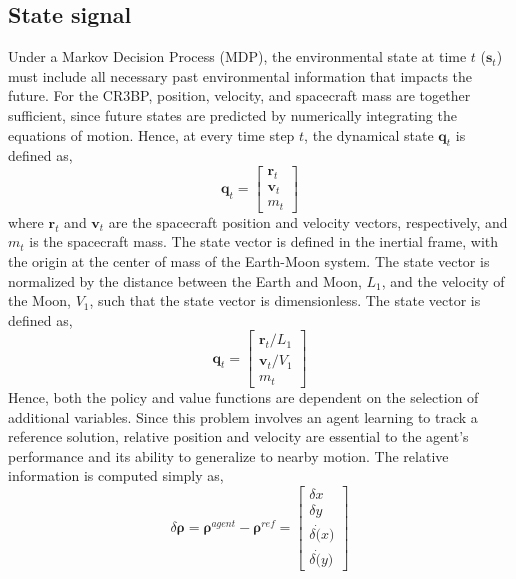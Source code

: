 \documentclass[conference]{IEEEtran}
\begin{document}
\subsection{State signal}
Under a Markov Decision Process (MDP), the environmental state at time \(t\) (\(\boldsymbol{s}_t\)) must include all necessary past environmental information that impacts the future. For the CR3BP, position, velocity, and spacecraft mass are together sufficient, since future states are predicted by numerically integrating the equations of motion. Hence, at every time step \(t\), the dynamical state \(\boldsymbol{q}_t\)
 is defined as,
\begin{equation}
    \boldsymbol{q}_t = \begin{bmatrix}
        \boldsymbol{r}_t \\
        \boldsymbol{v}_t \\
        m_t
    \end{bmatrix}
\end{equation}
where \(\boldsymbol{r}_t\) and \(\boldsymbol{v}_t\) are the spacecraft position and velocity vectors, respectively, and \(m_t\) is the spacecraft mass. The state vector is defined in the inertial frame, with the origin at the center of mass of the Earth-Moon system. The state vector is normalized by the distance between the Earth and Moon, \(L_1\), and the velocity of the Moon, \(V_1\), such that the state vector is dimensionless. The state vector is defined as,
\begin{equation}
    \boldsymbol{q}_t = \begin{bmatrix}
        \boldsymbol{r}_t/L_1 \\
        \boldsymbol{v}_t/V_1 \\
        m_t
    \end{bmatrix}
\end{equation}
Hence, both the policy and value functions are dependent on the selection of additional variables. Since this problem involves an agent learning to track a reference solution, relative position and velocity are essential to the agent's performance and its ability to generalize to nearby motion. The relative information is computed simply as,
\[
    \delta \boldsymbol{\rho} = \boldsymbol{
        \rho
    }^{agent} - \boldsymbol{
        \rho
    }^{ref} = \begin{bmatrix}
        \delta x \\
        \delta y \\
        \delta \dot(x) \\
        \delta \dot(y)
    \end{bmatrix}
\]
\end{document}
